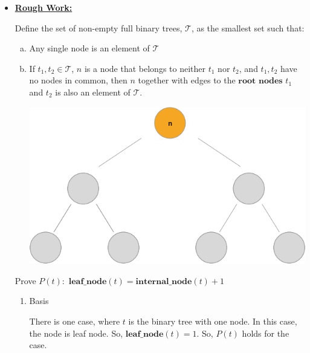 \documentclass[12pt]{article}
\begin{document}
\begin{itemize}
    \item

    \bigskip

    \begin{mdframed}
        \underline{\textbf{Rough Work:}}

        \bigskip

        Define the set of non-empty full binary trees, $\mathcal{T}$, as the
        smallest set such that:

        \begin{enumerate}[a.]
            \item Any single node is an element of $\mathcal{T}$
            \item If $t_1,t_2 \in \mathcal{T}$, $n$ is a node that belongs to neither
            $t_1$ nor $t_2$, and $t_1,t_2$ have no nodes in common, then $n$
            together with edges to the $\textbf{root nodes}$ $t_1$ and $t_2$ is
            also an element of $\mathcal{T}$.


            \begin{center}
            \includegraphics[width=0.8\linewidth]{images/worksheet_3_q3_note.png}
            \end{center}

         \end{enumerate}

        Prove $P(t):$ $\textbf{leaf\_node}(t) = \textbf{internal\_node}(t) + 1$

        \begin{enumerate}[1.]
            \item Basis

            \begin{mdframed}
            There is one case, where $t$ is the binary tree with one node. In
            this case, the node is leaf node. So, $\textbf{leaf\_node}(t) = 1$.
            So, $P(t)$ holds for the case.
            \end{mdframed}


\end{enumerate}
\end{mdframed}
\end{itemize}
\end{document}
